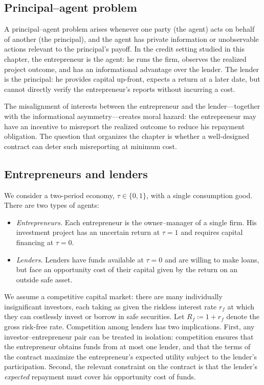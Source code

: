 \documentclass[11pt,a4paper,oneside]{book}
\theoremstyle{plain}
\theoremstyle{definition}
\theoremstyle{remark}
\numberwithin{equation}{chapter}
\begin{document}
\subsection{Principal--agent problem}

A principal--agent problem arises whenever one party (the agent) acts on behalf of another (the principal), and the agent has private information or unobservable actions relevant to the principal's payoff.
In the credit setting studied in this chapter, the entrepreneur is the agent: he runs the firm, observes the realized project outcome, and has an informational advantage over the lender.
The lender is the principal: he provides capital up-front, expects a return at a later date, but cannot directly verify the entrepreneur's reports without incurring a cost.

The misalignment of interests between the entrepreneur and the lender---together with the informational asymmetry---creates moral hazard: the entrepreneur may have an incentive to misreport the realized outcome to reduce his repayment obligation.
The question that organizes the chapter is whether a well-designed contract can deter such misreporting at minimum cost.

\subsection{Entrepreneurs and lenders}

We consider a two-period economy, $\tau \in \{0, 1\}$, with a single consumption good.
There are two types of agents:
\begin{itemize}
  \item \emph{Entrepreneurs.}
  Each entrepreneur is the owner--manager of a single firm.
  His investment project has an uncertain return at $\tau = 1$ and requires capital financing at $\tau = 0$.
  \item \emph{Lenders.}
  Lenders have funds available at $\tau = 0$ and are willing to make loans, but face an opportunity cost of their capital given by the return on an outside safe asset.
\end{itemize}

We assume a competitive capital market: there are many individually insignificant investors, each taking as given the riskless interest rate $r_f$ at which they can costlessly invest or borrow in safe securities.
Let $R_f \coloneqq 1 + r_f$ denote the gross risk-free rate.
Competition among lenders has two implications.
First, any investor--entrepreneur pair can be treated in isolation: competition ensures that the entrepreneur obtains funds from at most one lender, and that the terms of the contract maximize the entrepreneur's expected utility subject to the lender's participation.
Second, the relevant constraint on the contract is that the lender's \emph{expected} repayment must cover his opportunity cost of funds.
\end{document}
